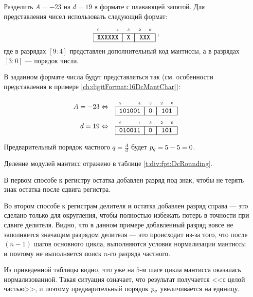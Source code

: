 \begin{Example}
    Разделить $A=-23$ на $d=19$ в формате с плавающей запятой. Для представления чисел использовать следующий формат:
    \[\FloatMyDcOrderX{XXXXXX}{X}{XXX},\]
    где в разрядах $[9:4]$ представлен дополнительный код мантиссы, а в разрядах $[3:0]$ --- порядок числа.
\end{Example}
\begin{Solve}
    В заданном формате числа будут представляться так (см. особенности представления в примере \ref{ch:digitFormat:16DcMantChar}):
    
    \begin{align*}
        A=-23 & \Leftrightarrow & \FloatMyDcOrderX{101001}{0}{101}\\
         d=19 & \Leftrightarrow & \FloatMyDcOrderX{010011}{0}{101}
    \end{align*}
    
    Предварительный порядок частного $q=\frac{A}{d}$ будет $p_{q}=5-5=0$.
    
    Деление модулей мантисс отражено в таблице \ref{t:div:fpt:DcRounding}.
    
    В первом способе к регистру остатка добавлен разряд под знак, чтобы не терять знак остатка после сдвига регистра.
    
    Во втором способе к регистрам делителя и остатка добавлен разряд справа --- это сделано только для округления, чтобы полностью избежать потерь в точности при сдвиге делителя. Видно, что в данном примере добавленный разряд вовсе не заполняется значащим разрядом делителя --- это происходит из-за того, что после $(n-1)$ шагов основного цикла, выполняются условия нормализации мантиссы и поэтому не выполняется поиск $n$-го разряда частного.

    Из приведенной таблицы видно, что уже на $5$-м шаге цикла мантисса оказалась нормализованной. Такая ситуация означает, что результат получается <<с целой частью>>, и поэтому предварительный порядок $p_{q}$ увеличивается на единицу.
    

\end{Solve}
